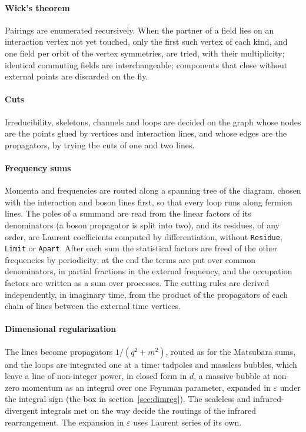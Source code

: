 \documentclass[11pt,a4paper]{article}
\newcommand{\pkg}[1]{\texttt{#1}}
\begin{document}
\paragraph{Wick's theorem} Pairings are enumerated recursively. When the partner of a field lies on an interaction
vertex not yet touched, only the first such vertex of each kind, and one field per orbit of the vertex symmetries, are
tried, with their multiplicity; identical commuting fields are interchangeable; components that close without external
points are discarded on the fly.

\paragraph{Cuts} Irreducibility, skeletons, channels and loops are decided on the graph whose nodes are the points glued
by vertices and interaction lines, and whose edges are the propagators, by trying the cuts of one and two lines.

\paragraph{Frequency sums} Momenta and frequencies are routed along a spanning tree of the diagram, chosen with the
interaction and boson lines first, so that every loop runs along fermion lines. The poles of a summand are read from the
linear factors of its denominators (a boson propagator is split into two), and its residues, of any order, are Laurent
coefficients computed by differentiation, without \pkg{Residue}, \pkg{Limit} or \pkg{Apart}. After
each sum the statistical factors are freed of the other frequencies by periodicity; at the end the terms are put over
common denominators, in partial fractions in the external frequency, and the occupation factors are written as a sum
over processes. The cutting rules are derived independently, in imaginary time, from the product of the propagators
of each chain of lines between the external time vertices.

\paragraph{Dimensional regularization} The lines become propagators $1/(q^2+m^2)$, routed as for the Matsubara sums, and
the loops are integrated one at a time: tadpoles and massless bubbles, which leave a line of non-integer power, in closed
form in $d$, a massive bubble at non-zero momentum as an integral over one Feynman parameter, expanded in $\varepsilon$
under the integral sign (the box in section~\ref{sec:dimreg}). The
scaleless and infrared-divergent integrals met on the way decide the routings of the infrared rearrangement. The
expansion in $\varepsilon$ uses Laurent series of its own.
\end{document}
